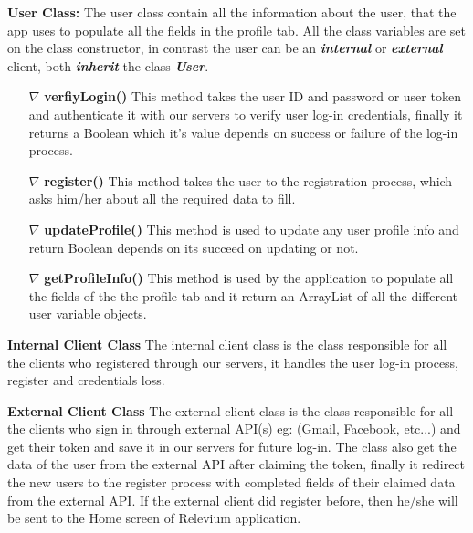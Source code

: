 \documentclass{scrreprt}
\begin{document}
     \textbf{User Class:} The user class contain all the information about the user, that the app uses to populate all the fields in the profile tab. All the class variables are set on the class constructor, in contrast the user can be an \textbf{\textit{internal}} or \textbf{\textit{external}} client, both \textit{\textbf{inherit}}  the class \textbf{\textit{User}}.
\begin{itemize}


\item[$\nabla$]  \textbf{verfiyLogin()}  This method takes the user ID and password or user token and authenticate it with our servers to verify user log-in credentials, finally it returns a Boolean which it's value depends on success or failure of the log-in process.
\item[$\nabla$] \textbf{register()} This method takes the user to the registration process, which asks him/her about all the required data to fill.
\item[$\nabla$] \textbf{updateProfile()} This method is used to update any user profile info and return Boolean depends on its succeed on updating or not.
\item[$\nabla$] \textbf{getProfileInfo()} This method is used by the application to populate all the fields of the the profile tab and it return an ArrayList of all the different user variable objects.

\end{itemize}

 \textbf{Internal Client Class}  The internal client class is the class responsible for all the clients who registered through our servers, it handles the user log-in process, register and credentials loss.
 
 \textbf{External Client Class} The external client class is the class responsible for all the clients who sign in through external API(s) eg: (Gmail, Facebook, etc...) and get their token and save it in our servers for future log-in. The class also get the data of the user from the external API after claiming the token, finally it redirect the new users to the register process with completed fields of their claimed data from the external API. If the external client did register before, then he/she will be sent to the Home screen of Relevium application.
\end{document}
